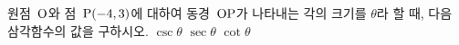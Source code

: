 원점~$\mathrm{O}$와 점~$\mathrm{P}(-4{,}\mkern3mu\mathopen{}3)$에 대하여 동경~$\mathrm{OP}$가 나타내는 각의 크기를 $\theta$라 할 때, 다음 삼각함수의 값을 구하시오.
 $\csc\theta$
 $\sec\theta$
 $\cot\theta$
